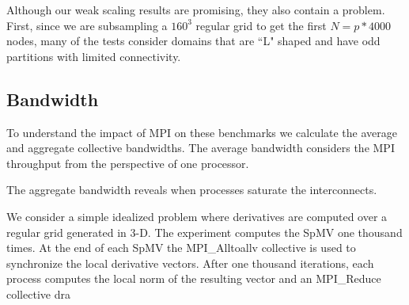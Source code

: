 \documentclass{report}
\begin{document}
Although our weak scaling results are promising, they also contain a problem. First, since we are subsampling a $160^3$ regular grid to get the first $N=p*4000$ nodes, many of the tests consider domains that are ``L" shaped and have odd partitions with limited connectivity.



\subsection{Bandwidth}

To understand the impact of MPI on these benchmarks we calculate the average and aggregate collective bandwidths. The average bandwidth considers the MPI throughput from the perspective of one processor. 

The aggregate bandwidth reveals when processes saturate the interconnects. 

We consider a simple idealized problem where derivatives are computed over a regular grid generated in 3-D. The experiment computes the SpMV one thousand times. At the end of each SpMV the MPI\_Alltoallv collective is used to synchronize the local derivative vectors. After one thousand iterations, each process computes the local norm of the resulting vector and an MPI\_Reduce collective dra
\end{document}
